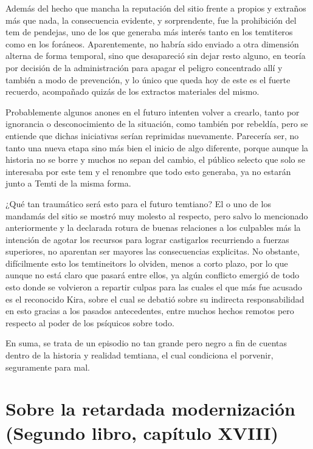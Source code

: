 \documentclass[
]{book}
\begin{document}
Además del hecho que mancha la reputación del sitio frente a propios y extraños más que nada, la consecuencia evidente, y sorprendente, fue la prohibición del tem de pendejas, uno de los que generaba más interés tanto en los temtiteros como en los foráneos. Aparentemente, no habría sido enviado a otra dimensión alterna de forma temporal, sino que desapareció sin dejar resto alguno, en teoría por decisión de la administración para apagar el peligro concentrado allí y también a modo de prevención, y lo único que queda hoy de este es el fuerte recuerdo, acompañado quizás de los extractos materiales del mismo.

Probablemente algunos anones en el futuro intenten volver a crearlo, tanto por ignorancia o desconocimiento de la situación, como también por rebeldía, pero se entiende que dichas iniciativas serían reprimidas nuevamente. Parecería ser, no tanto una nueva etapa sino más bien el inicio de algo diferente, porque aunque la historia no se borre y muchos no sepan del cambio, el público selecto que solo se interesaba por este tem y el renombre que todo esto generaba, ya no estarán junto a Temti de la misma forma.

¿Qué tan traumático será esto para el futuro temtiano? El o uno de los mandamás del sitio se mostró muy molesto al respecto, pero salvo lo mencionado anteriormente y la declarada rotura de buenas relaciones a los culpables más la intención de agotar los recursos para lograr castigarlos recurriendo a fuerzas superiores, no aparentan ser mayores las consecuencias explicitas. No obstante, difícilmente esto los temtineitors lo olviden, menos a corto plazo, por lo que aunque no está claro que pasará entre ellos, ya algún conflicto emergió de todo esto donde se volvieron a repartir culpas para las cuales el que más fue acusado es el reconocido Kira, sobre el cual se debatió sobre su indirecta responsabilidad en esto gracias a los pasados antecedentes, entre muchos hechos remotos pero respecto al poder de los psíquicos sobre todo.

En suma, se trata de un episodio no tan grande pero negro a fin de cuentas dentro de la historia y realidad temtiana, el cual condiciona el porvenir, seguramente para mal.

\hypertarget{sobre-la-retardada-modernizaciuxf3n-segundo-libro-capuxedtulo-xviii}{%
\section{Sobre la retardada modernización (Segundo libro, capítulo XVIII)}\label{sobre-la-retardada-modernizaciuxf3n-segundo-libro-capuxedtulo-xviii}}
\end{document}

